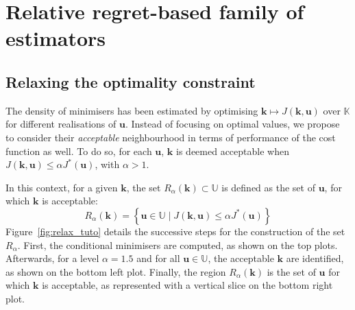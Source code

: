 \documentclass[preprint, 1p]{elsarticle}
\newcommand{\Prob}{\mathbb{P}}
\newcommand{\Kspace}{\mathbb{K}}
\newcommand{\Uspace}{\mathbb{U}}
\newcommand{\elise}[1]{{\itshape\color{red} ({#1})}}
\begin{document}


\section{Relative regret-based family of estimators}%
\label{sec:relax_constraint}
\subsection{Relaxing the optimality constraint}
The density of minimisers has been estimated by optimising $\mathbf{k}\mapsto J(\mathbf{k},\mathbf{u})$ over $\Kspace$ for different realisations of $\mathbf{u}$. Instead of focusing on optimal values, we propose to consider their {\it acceptable} neighbourhood in terms of performance of the cost function as well.
To do so, for each $\mathbf{u}$, $\mathbf{k}$ is deemed acceptable when  $J(\mathbf{k},\mathbf{u}) \leq \alpha J^*(\mathbf{u})$, with $\alpha > 1$. 


In this context, for a given $\mathbf{k}$, the set $R_{\alpha}(\mathbf{k}) \subset \Uspace$ is defined as the set of $\mathbf{u}$, for which $\mathbf{k}$ is acceptable:
\begin{equation}
\label{eq:def_Ralpha}
R_{\alpha}(\mathbf{k}) = \left\{ \mathbf{u} \in \Uspace \mid J(\mathbf{k},\mathbf{u}) \leq \alpha J^*(\mathbf{u}) \right\}
\end{equation}
Figure~\ref{fig:relax_tuto} details the successive steps for the construction of the set $R_{\alpha}$. First, the conditional minimisers are computed, as shown on the top plots. Afterwards, for a level $\alpha=1.5$ and for all $\mathbf{u} \in \Uspace$, the acceptable $\mathbf{k}$ are identified, as shown on the bottom left plot. Finally, the region $R_{\alpha}(\mathbf{k})$ is the set of $\mathbf{u}$ for which $\mathbf{k}$ is acceptable, as represented with a vertical slice on the bottom right plot.

\end{document}
